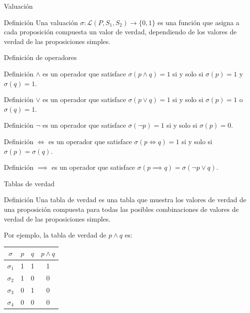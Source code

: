 \documentclass[dvisvgm,hypertex,aspectratio=169]{beamer}
\begin{document}
\begin{frame}{Valuación}
  \begin{block}{Definición}
    Una valuación $\sigma:\mathcal{L}(P, S_1, S_2)\to\{0,1\}$ es una función que asigna a cada proposición compuesta un valor de verdad, dependiendo de los valores de verdad de las proposiciones simples.
  \end{block}
\end{frame}
\begin{frame}{Definición de operadores}
  \pause
  \begin{block}{Definición}
    $\land$ es un operador que satisface $\sigma(p\land q)=1$ si y solo si $\sigma(p)=1$ y $\sigma(q)=1$.
  \end{block}
  \pause
  \begin{block}{Definición}
    $\lor$ es un operador que satisface $\sigma(p\lor q)=1$ si y solo si $\sigma(p)=1$ o $\sigma(q)=1$.
  \end{block}
  \pause
  \begin{block}{Definición}
    $\neg$ es un operador que satisface $\sigma(\neg p)=1$ si y solo si $\sigma(p)=0$.
  \end{block}
  \pause
  \begin{block}{Definición}
    $\iff$ es un operador que satisface $\sigma(p\iff q)=1$ si y solo si $\sigma(p)=\sigma(q)$.
  \end{block} 
  \pause
  \begin{block}{Definición}
    $\implies$ es un operador que satisface $\sigma(p\implies q)=\sigma(\neg p\lor q)$.
  \end{block}
\end{frame}
\begin{frame}{Tablas de verdad}
  \begin{block}{Definición}
    Una tabla de verdad es una tabla que muestra los valores de verdad de una proposición compuesta para todas las posibles combinaciones de valores de verdad de las proposiciones simples.

    \pause
    Por ejemplo, la tabla de verdad de $p\land q$ es:
    \begin{center}
      \begin{tabular}{ |c|c|c|c| }
        \hline
        $\sigma$ & $p$ & $q$ & $p\land q$ \\
        \hline
        $\sigma_1$ & 1 & 1 & 1 \\
        $\sigma_2$ & 1 & 0 & 0 \\
        $\sigma_3$ & 0 & 1 & 0 \\
        $\sigma_4$ & 0 & 0 & 0 \\
        \hline
      \end{tabular}
    \end{center}
  \end{block}
\end{frame}
\end{document}
